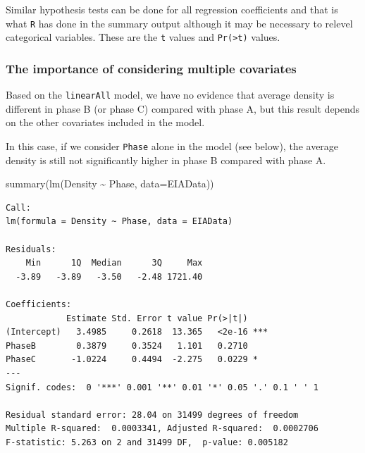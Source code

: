\documentclass[
  oneside]{krantz}
\newenvironment{Shaded}{\begin{snugshade}}{\end{snugshade}}
\newcommand{\AttributeTok}[1]{\textcolor[rgb]{0.77,0.63,0.00}{#1}}
\newcommand{\FunctionTok}[1]{\textcolor[rgb]{0.00,0.00,0.00}{#1}}
\newcommand{\NormalTok}[1]{#1}
\newcommand{\SpecialCharTok}[1]{\textcolor[rgb]{0.00,0.00,0.00}{#1}}
\begin{document}
Similar hypothesis tests can be done for all regression coefficients and that is what \texttt{R} has done in the summary output although it may be necessary to relevel categorical variables. These are the \texttt{t} values and \texttt{Pr(\textgreater{}\textbar{}t\textbar{})} values.

\hypertarget{the-importance-of-considering-multiple-covariates}{%
\subsubsection{The importance of considering multiple covariates}\label{the-importance-of-considering-multiple-covariates}}

Based on the \texttt{linearAll} model, we have no evidence that average density is different in phase B (or phase C) compared with phase A, but this result depends on the other covariates included in the model.

In this case, if we consider \texttt{Phase} alone in the model (see below), the average density is still not significantly higher in phase B compared with phase A.

\small

\begin{Shaded}
\begin{Highlighting}[]
\FunctionTok{summary}\NormalTok{(}\FunctionTok{lm}\NormalTok{(Density }\SpecialCharTok{\textasciitilde{}}\NormalTok{ Phase, }\AttributeTok{data=}\NormalTok{EIAData))}
\end{Highlighting}
\end{Shaded}

\begin{verbatim}
Call:
lm(formula = Density ~ Phase, data = EIAData)

Residuals:
    Min      1Q  Median      3Q     Max 
  -3.89   -3.89   -3.50   -2.48 1721.40 

Coefficients:
            Estimate Std. Error t value Pr(>|t|)    
(Intercept)   3.4985     0.2618  13.365   <2e-16 ***
PhaseB        0.3879     0.3524   1.101   0.2710    
PhaseC       -1.0224     0.4494  -2.275   0.0229 *  
---
Signif. codes:  0 '***' 0.001 '**' 0.01 '*' 0.05 '.' 0.1 ' ' 1

Residual standard error: 28.04 on 31499 degrees of freedom
Multiple R-squared:  0.0003341, Adjusted R-squared:  0.0002706 
F-statistic: 5.263 on 2 and 31499 DF,  p-value: 0.005182
\end{verbatim}

\normalsize
\end{document}
